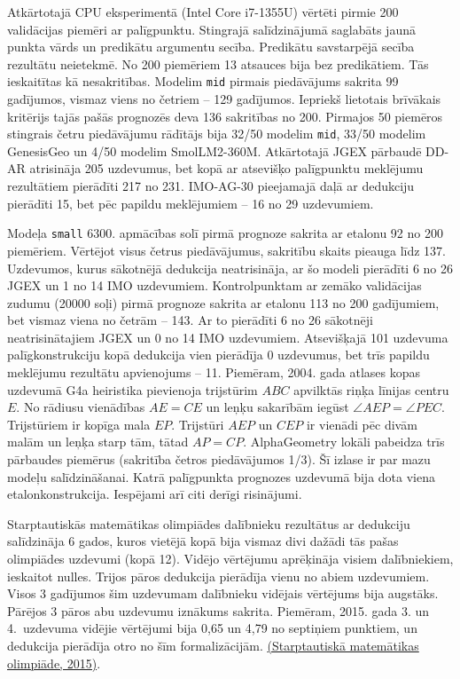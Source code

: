 Atkārtotajā CPU eksperimentā (Intel Core i7-1355U) vērtēti pirmie 200 validācijas piemēri ar palīgpunktu. Stingrajā salīdzinājumā saglabāts jaunā punkta vārds un predikātu argumentu secība. Predikātu savstarpējā secība rezultātu neietekmē. No 200 piemēriem 13 atsauces bija bez predikātiem. Tās ieskaitītas kā nesakritības. Modelim \texttt{mid} pirmais piedāvājums sakrita 99 gadījumos, vismaz viens no četriem -- 129 gadījumos. Iepriekš lietotais brīvākais kritērijs tajās pašās prognozēs deva 136 sakritības no 200. Pirmajos 50 piemēros stingrais četru piedāvājumu rādītājs bija 32/50 modelim \texttt{mid}, 33/50 modelim GenesisGeo un 4/50 modelim SmolLM2-360M. Atkārtotajā JGEX pārbaudē DD-AR atrisināja 205 uzdevumus, bet kopā ar atsevišķo palīgpunktu meklējumu rezultātiem pierādīti 217 no 231. IMO-AG-30 pieejamajā daļā ar dedukciju pierādīti 15, bet pēc papildu meklējumiem -- 16 no 29 uzdevumiem.

Modeļa \texttt{small} 6300. apmācības solī pirmā prognoze sakrita ar etalonu 92 no 200 piemēriem. Vērtējot visus četrus piedāvājumus, sakritību skaits pieauga līdz 137. Uzdevumos, kurus sākotnējā dedukcija neatrisināja, ar šo modeli pierādīti 6 no 26 JGEX un 1 no 14 IMO uzdevumiem. Kontrolpunktam ar zemāko validācijas zudumu (20000 soļi) pirmā prognoze sakrita ar etalonu 113 no 200 gadījumiem, bet vismaz viena no četrām -- 143. Ar to pierādīti 6 no 26 sākotnēji neatrisinātajiem JGEX un 0 no 14 IMO uzdevumiem. Atsevišķajā 101 uzdevuma palīgkonstrukciju kopā dedukcija vien pierādīja 0 uzdevumus, bet trīs papildu meklējumu rezultātu apvienojums -- 11. Piemēram, 2004. gada atlases kopas uzdevumā G4a heiristika pievienoja trijstūrim $ABC$ apvilktās riņķa līnijas centru $E$. No rādiusu vienādības $AE=CE$ un leņķu sakarībām iegūst $\angle AEP=\angle PEC$. Trijstūriem ir kopīga mala $EP$. Trijstūri $AEP$ un $CEP$ ir vienādi pēc divām malām un leņķa starp tām, tātad $AP=CP$. AlphaGeometry lokāli pabeidza trīs pārbaudes piemērus (sakritība četros piedāvājumos 1/3). Šī izlase ir par mazu modeļu salīdzināšanai. Katrā palīgpunkta prognozes uzdevumā bija dota viena etalonkonstrukcija. Iespējami arī citi derīgi risinājumi.

Starptautiskās matemātikas olimpiādes dalībnieku rezultātus ar dedukciju salīdzināja 6 gados, kuros vietējā kopā bija vismaz divi dažādi tās pašas olimpiādes uzdevumi (kopā 12). Vidējo vērtējumu aprēķināja visiem dalībniekiem, ieskaitot nulles. Trijos pāros dedukcija pierādīja vienu no abiem uzdevumiem. Visos 3 gadījumos šim uzdevumam dalībnieku vidējais vērtējums bija augstāks. Pārējos 3 pāros abu uzdevumu iznākums sakrita. Piemēram, 2015. gada 3. un 4.~uzdevuma vidējie vērtējumi bija 0,65 un 4,79 no septiņiem punktiem, un dedukcija pierādīja otro no šīm formalizācijām. \href{https://www.imo-official.org/results/individual/year/2015/}{(Starptautiskā matemātikas olimpiāde, 2015)}.